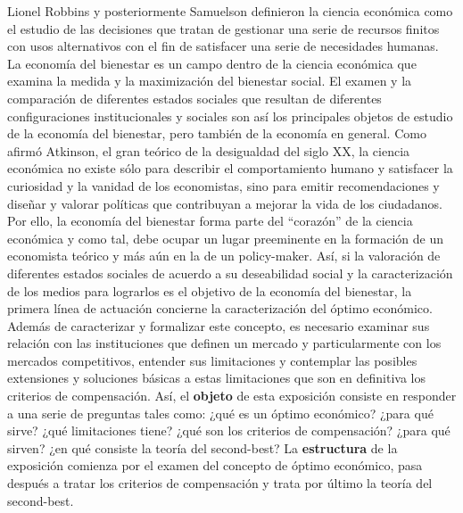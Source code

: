 \documentclass{nuevotema}
\begin{document}
\ideaclave

Lionel Robbins y posteriormente Samuelson definieron la ciencia económica como el estudio de las decisiones que tratan de gestionar una serie de recursos finitos con usos alternativos con el fin de satisfacer una serie de necesidades humanas. La economía del bienestar es un campo dentro de la ciencia económica que examina la medida y la maximización del bienestar social. El examen y la comparación de diferentes estados sociales que resultan de diferentes configuraciones institucionales y sociales son así los principales objetos de estudio de la economía del bienestar, pero también de la economía en general. Como afirmó Atkinson, el gran teórico de la desigualdad del siglo XX, la ciencia económica no existe sólo para describir el comportamiento humano y satisfacer la curiosidad y la vanidad de los economistas, sino para emitir recomendaciones y diseñar y valorar políticas que contribuyan a mejorar la vida de los ciudadanos. Por ello, la economía del bienestar forma parte del ``corazón'' de la ciencia económica y como tal, debe ocupar un lugar preeminente en la formación de un economista teórico y más aún en la de un policy-maker. Así, si la valoración de diferentes estados sociales de acuerdo a su deseabilidad social y la caracterización de los medios para lograrlos es el objetivo de la economía del bienestar, la primera línea de actuación concierne la caracterización del óptimo económico. Además de caracterizar y formalizar este concepto, es necesario examinar sus relación con las instituciones que definen un mercado y particularmente con los mercados competitivos, entender sus limitaciones y contemplar las posibles extensiones y soluciones básicas a estas limitaciones que son en definitiva los criterios de compensación. Así, el \textbf{objeto} de esta exposición consiste en responder a una serie de preguntas tales como: ¿qué es un óptimo económico? ¿para qué sirve? ¿qué limitaciones tiene? ¿qué son los criterios de compensación? ¿para qué sirven? ¿en qué consiste la teoría del second-best? La \textbf{estructura} de la exposición comienza por el examen del concepto de óptimo económico, pasa después a tratar los criterios de compensación y trata por último la teoría del second-best.
\end{document}
